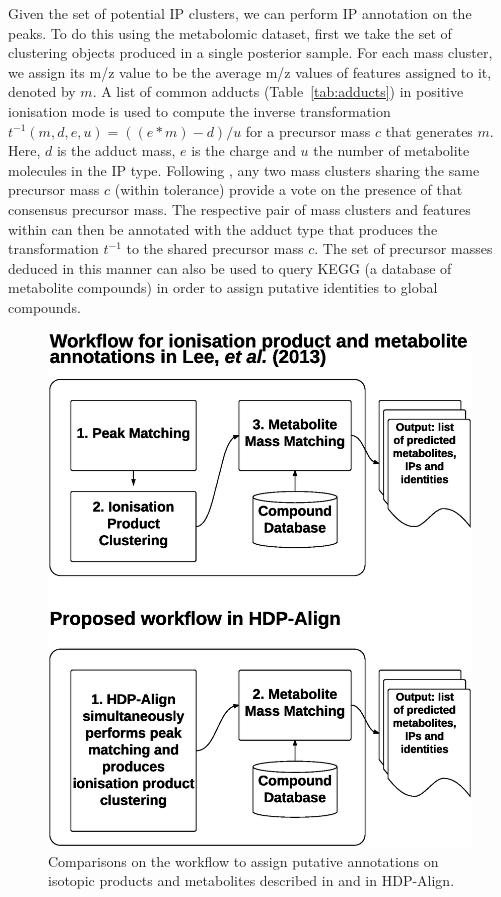 Given the set of potential IP clusters, we can perform IP annotation on the peaks. To do this using the metabolomic dataset, first we take the set of clustering objects produced in a single posterior sample. For each mass cluster, we assign its m/z value to be the average m/z values of features assigned to it, denoted by $m$. A list of common adducts (Table~\ref{tab:adducts}) in positive ionisation mode is used to compute the inverse transformation $t^{-1}(m,d,e,u) = ((e*m)-d)/u$ for a precursor mass $c$ that generates $m$. Here, $d$ is the adduct mass, $e$ is the charge and $u$ the number of metabolite molecules in the IP type. Following \cite{Lee2013}, any two mass clusters sharing the same precursor mass $c$ (within tolerance) provide a vote on the presence of that consensus precursor mass. The respective pair of mass clusters and features within can then be annotated with the adduct type that produces the transformation $t^{-1}$ to the shared precursor mass $c$. The set of precursor masses deduced in this manner can also be used to query KEGG (a database of metabolite compounds) in order to assign putative identities to global compounds.

\begin{figure}[!htbp]
\centering\includegraphics[width=0.7\linewidth]{05-hdp/figures/figure_3.eps}
\centering\caption{Comparisons on the workflow to assign putative annotations on isotopic products and metabolites described in \cite{Lee2013} and in HDP-Align.\label{fig-workflow}}
\end{figure}

